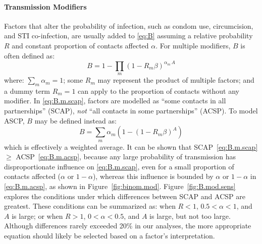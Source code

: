 \paragraph{Transmission Modifiers}
Factors that alter the probability of infection,
such as condom use, circumcision, and STI co-infection,
are usually added to \eqref{eq:B} assuming
a relative probability $R$ and constant proportion of contacts affected $\alpha$.
For multiple modifiers, $B$ is often defined as:
\begin{equation}\label{eq:B.m.scap}
  B = 1 - \prod_{m} {(1 - R_m \beta)}^{\alpha_m\,A}
\end{equation}
where: $\sum_m \alpha_m = 1$;
some $R_m$ may represent the product of multiple factors;
and a dummy term $R_m = 1$ can apply to the proportion of contacts without any modifier.
In \eqref{eq:B.m.scap},
factors are modelled as ``some contacts in all partnerships'' (SCAP),
\emph{not} ``all contacts in some partnerships'' (ACSP).
To model ASCP, $B$ may be defined instead as:
\begin{equation}\label{eq:B.m.acsp}
  B = \sum_{m} \alpha_m \left(1 - {(1 - R_m \beta)}^A\right)
\end{equation}
which is effectively a weighted average.
It can be shown that SCAP~\eqref{eq:B.m.scap} $\ge$ ACSP~\eqref{eq:B.m.acsp},
because any large probability of transmission
has disproportionate influence on \eqref{eq:B.m.scap},
even for a small proportion of contacts affected ($\alpha$ or $1-\alpha$),
whereas this influence is bounded by $\alpha$ or $1-\alpha$ in \eqref{eq:B.m.acsp},
as shown in Figure~\ref{fig:binom.mod}.
Figure~\ref{fig:B.mod.sens} explores the conditions under which
differences between SCAP and ACSP are greatest.
These conditions can be summarized as:
when $R < 1$, $0.5 < \alpha < 1$, and $A$ is large; or
when $R > 1$, $0 < \alpha < 0.5$, and $A$ is large, but not too large.
Although differences rarely exceeded 20\% in our analyses,
the more appropriate equation should likely be selected based on a factor's interpretation.
